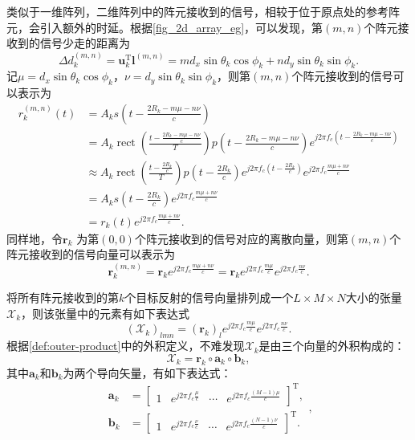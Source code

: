 类似于一维阵列，二维阵列中的阵元接收到的信号，相较于位于原点处的参考阵元，会引入额外的时延。根据\cref{fig_2d_array_eg}，可以发现，第\( (m,n) \)个阵元接收到的信号少走的距离为
\[
    \Delta d^{(m,n)}_k = \bm{u}_k^{\mathrm{T}} \bm{l}^{(m,n)} = m d_x \sin\theta_k \cos\phi_k + n d_y \sin\theta_k \sin\phi_k.
\]
记\( \mu = d_x \sin\theta_k \cos\phi_k \)，\( \nu = d_y \sin\theta_k \sin\phi_k \)，则第\( (m,n) \)个阵元接收到的信号可以表示为
\[
    \begin{split}
        r^{(m,n)}_k(t) & = A_k s\left(t - \frac{2 R_k - m \mu - n \nu}{c}\right)                                                                                                                                                \\
                       & = A_k \operatorname{rect}\left(\frac{t - \frac{2 R_k - m \mu - n \nu}{c}}{T}\right) p\left(t - \frac{2 R_k - m \mu - n \nu}{c}\right) e^{j 2 \pi f_c \left(t - \frac{2 R_k - m \mu - n \nu}{c}\right)} \\
                       & \approx A_k \operatorname{rect}\left(\frac{t - \frac{2 R_k}{c}}{T}\right) p\left(t - \frac{2 R_k}{c}\right) e^{j 2 \pi f_c \left(t - \frac{2 R_k}{c}\right)} e^{j 2 \pi f_c \frac{m \mu + n \nu}{c}}   \\
                       & = A_k s\left(t - \frac{2 R_k}{c}\right) e^{j 2 \pi f_c \frac{m \mu + n \nu}{c}}                                                                                                                        \\
                       & = r_k(t) e^{j 2 \pi f_c \frac{m \mu + n \nu}{c}}.
    \end{split}
\]
同样地，令\( \bm{r}_k \) 为第\( (0,0) \)个阵元接收到的信号对应的离散向量，则第\( (m,n) \)个阵元接收到的信号向量可以表示为
\[
    \bm{r}_k^{(m,n)} = \bm{r}_k e^{j 2 \pi f_c \frac{m \mu + n \nu}{c}} = \bm{r}_k e^{j 2 \pi f_c \frac{m \mu}{c}} e^{j 2 \pi f_c \frac{n \nu}{c}}.
\]

将所有阵元接收到的第\( k \)个目标反射的信号向量排列成一个\( L \times M \times N \)大小的张量\( \mathcal{X}_k \)，则该张量中的元素有如下表达式
\[
    \left( \mathcal{X}_k \right)_{lmn} = \left( \bm{r}_k \right)_l e^{j 2 \pi f_c \frac{m \mu}{c}} e^{j 2 \pi f_c \frac{n \nu}{c}}.
\]
根据\cref{def:outer-product}中的外积定义，不难发现\( \mathcal{X}_k \)是由三个向量的外积构成的：
\[
    \mathcal{X}_k = \bm{r}_k \circ \bm{a}_k \circ \bm{b}_k,
\]
其中\( \bm{a}_k \)和\( \bm{b}_k \)为两个导向矢量，有如下表达式：
\[
    \begin{split}
        \bm{a}_k & = \begin{bmatrix}
                         1 & e^{j 2 \pi f_c \frac{\mu}{c}} & \cdots & e^{j 2 \pi f_c \frac{(M-1) \mu}{c}}
                     \end{bmatrix}^{\mathrm{T}}, \\
        \bm{b}_k & = \begin{bmatrix}
                         1 & e^{j 2 \pi f_c \frac{\nu}{c}} & \cdots & e^{j 2 \pi f_c \frac{(N-1) \nu}{c}}
                     \end{bmatrix}^{\mathrm{T}}.
    \end{split},
\]

